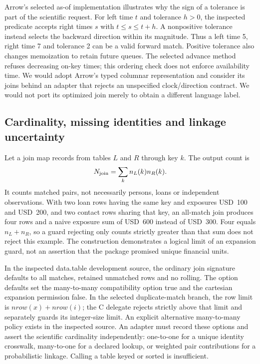 Arrow's selected as-of implementation illustrates why the sign of a tolerance is part of the scientific request. For left time $t$ and tolerance $h>0$, the inspected predicate accepts right times $s$ with $t\leq s\leq t+h$. A nonpositive tolerance instead selects the backward direction within its magnitude. Thus a left time 5, right time 7 and tolerance 2 can be a valid forward match. Positive tolerance also changes memoization to retain future queues. The selected advance method refuses decreasing on-key times; this ordering check does not enforce availability time. We would adopt Arrow's typed columnar representation and consider its joins behind an adapter that rejects an unspecified clock/direction contract. We would not port its optimized join merely to obtain a different language label.~\citep{exec25_dww_arrow,exec25_dww_choice}

\subsection{Cardinality, missing identities and linkage uncertainty}

Let a join map records from tables $L$ and $R$ through key $k$. The output count is
\[
 N_{\rm join}=\sum_k n_L(k)n_R(k).
\]
It counts matched pairs, not necessarily persons, loans or independent observations. With two loan rows having the same key and exposures USD~100 and USD~200, and two contact rows sharing that key, an all-match join produces four rows and a naive exposure sum of USD~600 instead of USD~300. Four equals $n_L+n_R$, so a guard rejecting only counts strictly greater than that sum does not reject this example. The construction demonstrates a logical limit of an expansion guard, not an assertion that the package promised unique financial units.~\citep{exec25_dww_choice}

In the inspected data.table development source, the ordinary join signature defaults to all matches, retained unmatched rows and no rolling. The option defaults set the many-to-many compatibility option true and the cartesian expansion permission false. In the selected duplicate-match branch, the row limit is $nrow(x)+nrow(i)$; the C delegate rejects strictly above that limit and separately guards its integer-size limit. An explicit alternative many-to-many policy exists in the inspected source. An adapter must record these options and assert the scientific cardinality independently: one-to-one for a unique identity crosswalk, many-to-one for a declared lookup, or weighted pair contributions for a probabilistic linkage. Calling a table keyed or sorted is insufficient.~\citep{exec25_dww_datatable}

